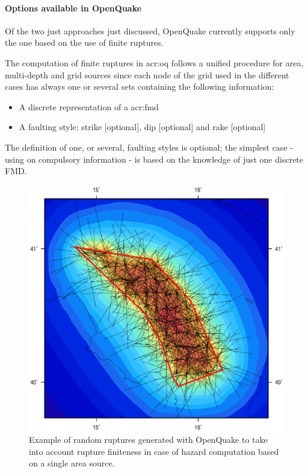 \paragraph{Options available in OpenQuake}
Of the two just approaches just discussed, OpenQuake currently supports 
only the one based on the use of finite ruptures.

The computation of finite ruptures in \gls{acr:oq} follows a unified 
procedure for area, multi-depth and grid sources since each node
of the grid used in the different cases has always one or several 
sets containing the following information:
%
\begin{itemize}
\item A discrete representation of a \gls{acr:fmd} 
\item A faulting style: strike [optional], dip [optional] and rake 
[optional] 
\end{itemize}
%
The definition of one, or several, faulting styles is optional; the 
simplest case - using on compulsory information - is based on the 
knowledge of just one discrete FMD.
%
\begin{figure}[!hb]
\centering
\includegraphics[width=13cm]{./Figures/Part_Hazard/area_source_finite_ruptures.eps}
\caption{Example of random ruptures generated with OpenQuake to take 
into account rupture finiteness in case of hazard computation based 
on a single area source.}
\label{fig:area_source_finite_ruptures}
\end{figure}
%

